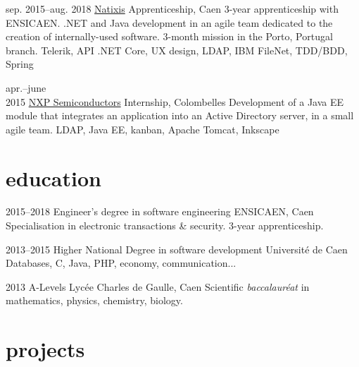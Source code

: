 \documentclass[]{friggeri-cv}
\begin{document}
\begin{entrylist}
    \entry
	{sep. 2015--aug. 2018}
    {\href{https://www.natixis.com}{Natixis}}
    {Apprenticeship, Caen}
    {3-year apprenticeship with ENSICAEN. \csharp .NET and Java development in an agile team dedicated to the creation of internally-used software. 3-month mission in the Porto, Portugal branch.}
    {Telerik, API .NET Core, UX design, LDAP, IBM FileNet, TDD/BDD, Spring}
    
    \entry
    {apr.--june\\2015}
    {\href{https://www.nxp.com}{NXP Semiconductors}}
    {Internship, Colombelles}
    {Development of a Java EE module that integrates an application into an Active Directory server, in a small agile team.}
    {LDAP, Java EE, kanban, Apache Tomcat, Inkscape}
\end{entrylist}

\section{education}

\begin{entrylist}
    \entry
    {2015--2018}
    {Engineer's degree {\normalfont in software engineering}}
    {ENSICAEN, Caen}
    {Specialisation in electronic transactions \& security. 3-year apprenticeship.}{}
    
    \entry
    {2013--2015}
    {Higher National Degree {\normalfont in software development}}
    {Université de Caen}
    {Databases, C, Java, PHP, economy, communication...}{}
    
    \entry
    {2013}
    {A-Levels}
    {Lycée Charles de Gaulle, Caen}
    {Scientific \textit{baccalauréat} in mathematics, physics, chemistry, biology.}{}
\end{entrylist}

\section{projects}
\end{document}
